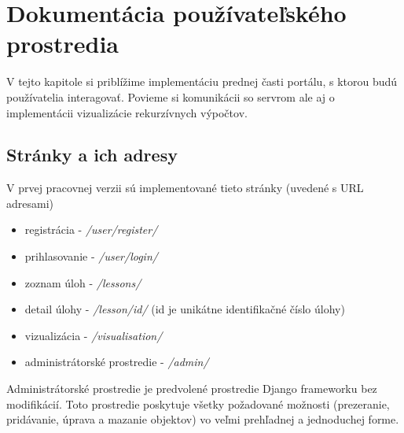 \chapter{Dokumentácia používateľského prostredia}

\label{kap:frontImpl}
V tejto kapitole si priblížime implementáciu prednej časti portálu, s ktorou
budú používatelia interagovať. Povieme si komunikácii so servrom ale aj o
implementácii vizualizácie rekurzívnych výpočtov.
\section{Stránky a ich adresy}
V prvej pracovnej verzii sú implementované tieto stránky (uvedené s URL adresami)
\begin{itemize}
  \item registrácia - \textit{/user/register/}
  \item prihlasovanie - \textit{/user/login/}
  \item zoznam úloh - \textit{/lessons/}
  \item detail úlohy - \textit{/lesson/id/} (id je unikátne identifikačné číslo úlohy)
  \item vizualizácia - \textit{/visualisation/}
  \item administrátorské prostredie - \textit{/admin/}
\end{itemize}

Administrátorské prostredie je predvolené prostredie Django frameworku bez modifikácií.
Toto prostredie poskytuje všetky požadované možnosti (prezeranie, pridávanie, úprava
a mazanie objektov) vo veľmi prehľadnej a jednoduchej forme.
